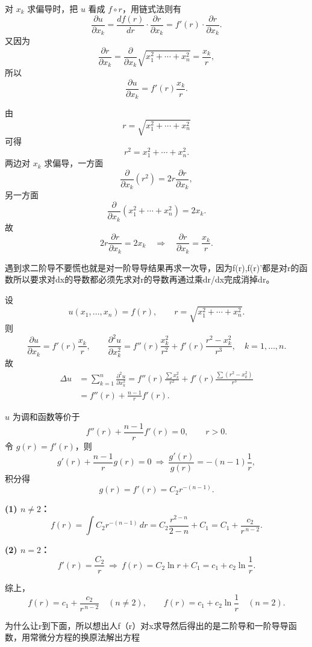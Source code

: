 \begin{dxtips}
  
对 $x_k$ 求偏导时，把 $u$ 看成 $f\circ r$，用链式法则有
\[
\frac{\partial u}{\partial x_k}
= \frac{d f(r)}{d r}\cdot \frac{\partial r}{\partial x_k}
= f'(r)\cdot \frac{\partial r}{\partial x_k}.
\]
又因为
\[
\frac{\partial r}{\partial x_k}
= \frac{\partial}{\partial x_k}
  \sqrt{x_1^2+\cdots+x_n^2}
= \frac{x_k}{r},
\]
所以
\[
\frac{\partial u}{\partial x_k}
= f'(r)\frac{x_k}{r}.
\]
\end{dxtips}
由
\[
r=\sqrt{x_1^2+\cdots+x_n^2}
\]
可得
\[
r^2=x_1^2+\cdots+x_n^2.
\]
两边对 $x_k$ 求偏导，一方面
\[
\frac{\partial}{\partial x_k}(r^2)
=2r\frac{\partial r}{\partial x_k},
\]
另一方面
\[
\frac{\partial}{\partial x_k}(x_1^2+\cdots+x_n^2)
=2x_k.
\]
故
\[
2r\frac{\partial r}{\partial x_k}=2x_k
\quad\Longrightarrow\quad
\frac{\partial r}{\partial x_k}=\frac{x_k}{r}.
\]
\begin{dxtips}
    遇到求二阶导不要慌也就是对一阶导导结果再求一次导，因为f(r),f(r)'都是对r的函数所以要求对dx的导数都必须先求对r的导数再通过乘dr/dx完成消掉dr。
\end{dxtips}
\begin{solution}
设
\[
u(x_1,\dots,x_n)=f(r),\qquad
r=\sqrt{x_1^2+\cdots+x_n^2}.
\]
则
\[
\frac{\partial u}{\partial x_k}
= f'(r)\frac{x_k}{r},\qquad
\frac{\partial^2 u}{\partial x_k^2}
= f''(r)\frac{x_k^2}{r^2}
  + f'(r)\frac{r^2-x_k^2}{r^3},
\quad k=1,\dots,n.
\]
故
\[
\begin{aligned}
\Delta u
&=\sum_{k=1}^n \frac{\partial^2 u}{\partial x_k^2}
= f''(r)\frac{\sum x_k^2}{r^2}
  + f'(r)\frac{\sum(r^2-x_k^2)}{r^3} \\
&= f''(r) + \frac{n-1}{r}f'(r).
\end{aligned}
\]

$u$ 为调和函数等价于
\[
f''(r)+\frac{n-1}{r}f'(r)=0,\qquad r>0.
\]
令 $g(r)=f'(r)$，则
\[
g'(r)+\frac{n-1}{r}g(r)=0
\ \Longrightarrow\
\frac{g'(r)}{g(r)}=-(n-1)\frac1r,
\]
积分得
\[
g(r)=f'(r)=C_2 r^{-(n-1)}.
\]

\textbf{(1) $n\ne 2$：}
\[
f(r)=\int C_2 r^{-(n-1)}\,dr
= C_2\frac{r^{2-n}}{2-n}+C_1
= C_1+\frac{c_2}{r^{\,n-2}}.
\]

\textbf{(2) $n=2$：}
\[
f'(r)=\frac{C_2}{r}
\ \Longrightarrow\
f(r)=C_2\ln r + C_1
= c_1 + c_2\ln\frac1r.
\]

综上，
\[
f(r)=c_1+\frac{c_2}{r^{\,n-2}}\quad (n\ne 2),\qquad
f(r)=c_1+c_2\ln\frac1r\quad (n=2).
\]
\end{solution}
\begin{dxtips}
    为什么让r到下面，所以想出人f（r）对x求导然后得出的是二阶导和一阶导导函数，用常微分方程的换原法解出方程
\end{dxtips}
